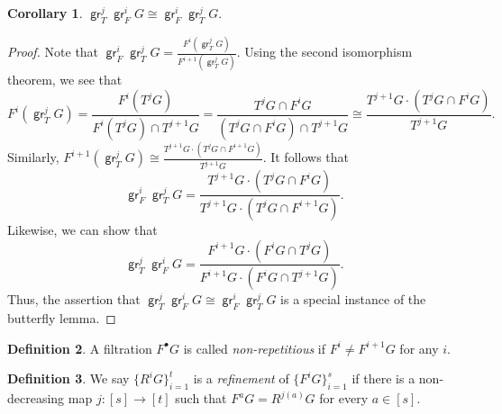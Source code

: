 \documentclass[10pt,letterpaper,cm]{nupset}
\theoremstyle{definition}
\newtheorem{definition}{Definition}[subsection]
\theoremstyle{theorem}
\newtheorem{corollary}[definition]{Corollary}
\theoremstyle{remark}
\newcommand{\1}{\mathbf{1}}
\newcommand{\0}{\vec 0}
\DeclareMathOperator{\gr}{\mathsf{gr}}
\begin{document}
\begin{corollary}
$\gr_T^j\gr_F^i{G} \cong \gr_F^i \gr_T^j{G}$.
\end{corollary}
\begin{proof}
Note that $\gr_F^i \gr_T^j{G} = \frac{F^i(\gr_T^j{G})}{F^{i+1}(\gr_T^j{G})}$. 
Using the second isomorphism theorem, we see that $$F^i(\gr_T^j{G}) = \frac{F^i(T^j{G})}{F^i(T^j{G}) \cap T^{j+1}{G}} = \frac{T^j{G} \cap F^i{G}}{(T^j{G} \cap F^i{G}) \cap T^{j+1}{G}} \cong \frac{T^{j+1}{G} \cdot (T^j{G} \cap F^i{G})}{T^{j+1}{G}} .$$ 
Similarly, $F^{i+1}(\gr_T^j{G}) \cong \frac{T^{j+1}{G} \cdot (T^j{G} \cap F^{i+1}{G})}{T^{j+1}{G}}.$ 
It follows that $$\gr_F^i \gr_T^j{G} = \frac{T^{j+1}{G} \cdot (T^j{G} \cap F^{i}{G})}{T^{j+1}{G} \cdot (T^j{G} \cap F^{i+1}{G})}.$$
Likewise, we can show that
$$\gr_T^j \gr_F^i{G} = \frac{F^{i+1}{G} \cdot (F^i{G} \cap T^{j}{G})}{F^{i+1}{G} \cdot (F^i{G} \cap T^{j+1}{G})}.$$ Thus, the assertion that $\gr_T^j\gr_F^i{G} \cong \gr_F^i \gr_T^j{G}$ is a special instance of the butterfly lemma. 
\end{proof}

\begin{definition}
A filtration $F^{\bullet}G$ is called \textit{non-repetitious} if $F^i \ne F^{i+1}G$ for any $i$. 
\end{definition}

\begin{definition}
We say $\{R^iG\}_{i=1}^t$ is a \textit{refinement} of $\{F^iG\}_{i=1}^s$ if there is a non-decreasing map $j : [s] \to [t]$ such that $F^aG = R^{j(a)}G $ for every $a \in [s]$.
\end{definition}
\end{document}
